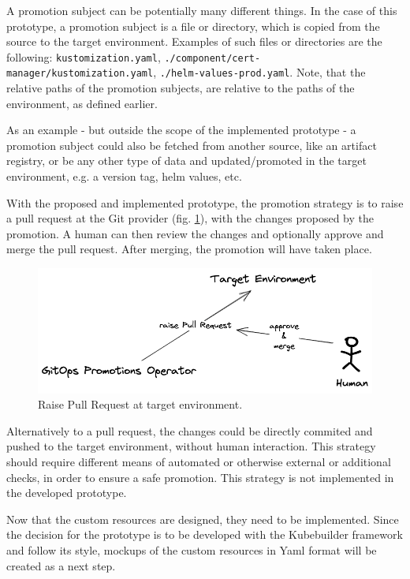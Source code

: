 A promotion subject can be potentially many different things.
In the case of this prototype,
a promotion subject is a file or directory,
which is copied from the source to the target environment.
Examples of such files or directories are the following:
\lstinline|kustomization.yaml|,
\lstinline|./component/cert-manager/kustomization.yaml|,
\lstinline|./helm-values-prod.yaml|.
Note, that the relative paths of the promotion subjects,
are relative to the paths of the environment, as defined earlier.

As an example - but outside the scope of the implemented prototype -
a promotion subject could also be fetched from another source,
like an artifact registry, or be any other type of data
and updated/promoted in the target environment,
e.g. a version tag, helm values, etc.

With the proposed and implemented prototype,
the promotion strategy is to raise a pull request at the Git provider
(fig. \ref{fig:raise-pull-request-and-approve}),
with the changes proposed by the promotion.
A human can then review the changes and optionally approve and merge the pull request.
After merging, the promotion will have taken place.

\begin{figure}[h]
	\centering
	\includegraphics[width=1.00\linewidth]{assets/raise-pull-request-and-approve.png}
	\caption{Raise Pull Request at target environment.
	}
	\label{fig:raise-pull-request-and-approve}	
\end{figure}

Alternatively to a pull request, the changes could be directly
commited and pushed to the target environment,
without human interaction. This strategy should require different means
of automated or otherwise external or additional checks, in order to ensure a safe promotion.
This strategy is not implemented in the developed prototype.

Now that the custom resources are designed,
they need to be implemented.
Since the decision for the prototype is to be developed
with the Kubebuilder framework and follow its style,
mockups of the custom resources in Yaml format
will be created as a next step.









